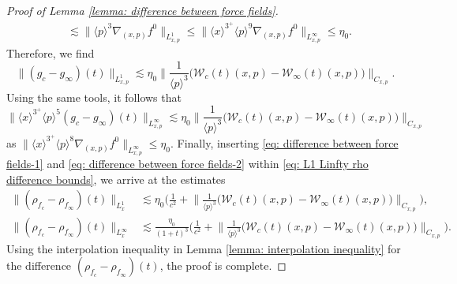 \documentclass[reqno, 11pt, letterpaper]{amsart}
\theoremstyle{remark}
\numberwithin{equation}{section}
\numberwithin{theorem}{section}
\numberwithin{table}{section}
\numberwithin{figure}{section}
\begin{document}
\begin{proof}[Proof of Lemma \ref{lemma: difference between force fields}]
$$\begin{aligned}
&\lesssim \big\|\langle p\rangle^3\nabla_{(x,p)}f^0 \big\|_{L_{x,p}^1}
\leq \Big\|\langle x\rangle^{3^+}\langle p \rangle^9\nabla_{(x,p)}f^0\Big\|_{L_{x,p}^\infty} \leq\eta_0.
\end{aligned}$$
Therefore, we find
\begin{equation}\label{eq: difference between force fields-1}
\|(g_c-g_\infty)(t)\|_{L_{x,p}^1}\lesssim \eta_0\Big\|\frac{1}{\langle p\rangle^3}\Big(\mathcal{W}_c(t)(x,p)-\mathcal{W}_\infty(t)(x,p)\Big)\Big\|_{C_{x,p}}.
\end{equation}
Using the same tools, it follows that 
\begin{equation}\label{eq: difference between force fields-2}
\Big\|\langle x\rangle^{3^+}\langle p\rangle^5(g_c-g_\infty)(t)\Big\|_{L^\infty_{x,p}}\lesssim \eta_0\Big\|\frac{1}{\langle p\rangle^3}\Big(\mathcal{W}_c(t)(x,p)-\mathcal{W}_\infty(t)(x,p)\Big)\Big\|_{C_{x,p}}
\end{equation}
as
$\Big\|\langle x\rangle^{3^+}\langle p \rangle^8\nabla_{(x,p)}f^0\Big\|_{L_{x,p}^\infty}\leq \eta_0.$
Finally, inserting \eqref{eq: difference between force fields-1} and \eqref{eq: difference between force fields-2} within \eqref{eq: L1 Linfty rho difference bounds}, we arrive at the estimates
$$
\begin{aligned}
\big\|(\rho_{f_c}-\rho_{f_\infty})(t)\big\|_{L_x^1}&\lesssim
\eta_0 \bigg(\frac{1}{c^2} + \Big\|\frac{1}{\langle p\rangle^3}\Big(\mathcal{W}_c(t)(x,p)-\mathcal{W}_\infty(t)(x,p)\Big)\Big\|_{C_{x,p}} \bigg),\\
\big\|(\rho_{f_c}-\rho_{f_\infty})(t)\big\|_{L_x^\infty}&\lesssim
\frac{\eta_0}{(1+t)^3}\bigg(\frac{1}{c^2} + \Big\|\frac{1}{\langle p\rangle^3}\Big(\mathcal{W}_c(t)(x,p)-\mathcal{W}_\infty(t)(x,p)\Big)\Big\|_{C_{x,p}} \bigg).
\end{aligned}
$$
Using the interpolation inequality in Lemma \ref{lemma: interpolation inequality} for the difference $(\rho_{f_c}-\rho_{f_\infty})(t)$, the proof is complete.
\end{proof}
\end{document}
